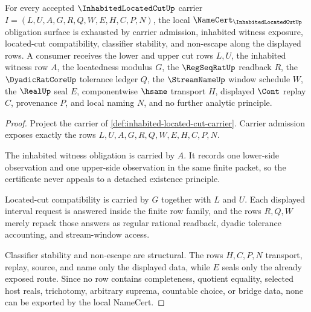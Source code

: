 \begin{theorem}
\label{thm:inhabited-located-cut-namecert-obligations}
For every accepted $\InhabitedLocatedCutUp$ carrier $I=(L,U,A,G,R,Q,W,E,H,C,P,N)$, the local $\NameCert_{\InhabitedLocatedCutUp}$ obligation surface is exhausted by carrier admission, inhabited witness exposure, located-cut compatibility, classifier stability, and non-escape along the displayed rows. A consumer receives the lower and upper cut rows $L,U$, the inhabited witness row $A$, the locatedness modulus $G$, the $\RegSeqRatUp$ readback $R$, the $\DyadicRatCoreUp$ tolerance ledger $Q$, the $\StreamNameUp$ window schedule $W$, the $\RealUp$ seal $E$, componentwise $\hsame$ transport $H$, displayed $\Cont$ replay $C$, provenance $P$, and local naming $N$, and no further analytic principle.
\end{theorem}
\begin{proof}
Project the carrier of \autoref{def:inhabited-located-cut-carrier}. Carrier admission exposes exactly the rows $L,U,A,G,R,Q,W,E,H,C,P,N$.

The inhabited witness obligation is carried by $A$. It records one lower-side observation and one upper-side observation in the same finite packet, so the certificate never appeals to a detached existence principle.

Located-cut compatibility is carried by $G$ together with $L$ and $U$. Each displayed interval request is answered inside the finite row family, and the rows $R,Q,W$ merely repack those answers as regular rational readback, dyadic tolerance accounting, and stream-window access.

Classifier stability and non-escape are structural. The rows $H,C,P,N$ transport, replay, source, and name only the displayed data, while $E$ seals only the already exposed route. Since no row contains completeness, quotient equality, selected host reals, trichotomy, arbitrary suprema, countable choice, or bridge data, none can be exported by the local NameCert.
\end{proof}

